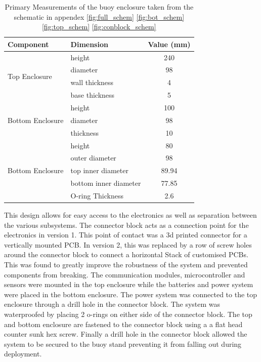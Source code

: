 \begin{table}[H]
    \centering
    \caption{Primary Measurements of the buoy enclosure taken from the schematic in appendex \ref{fig:full_schem} \ref{fig:bot_schem} \ref{fig:top_schem} \ref{fig:conblock_schem}}
    \begin{tabular}{||l  l c||}
    \hline
         \textbf{Component} &   \textbf{Dimension} &   \textbf{Value (mm)} \\
         \hline
         \hline
         \multirow{4}{*}{Top Enclosure} & height & 240\\
         &  diameter & 98  \\
         &  wall thickness & 4 \\ 
         & base thickness & 5 \\
         \hline
        \multirow{3}{*}{Bottom Enclosure} & height & 100\\
         &  diameter & 98  \\
         & thickness & 10 \\ 
         \hline
        \multirow{5}{*}{Bottom Enclosure} & height & 80\\
         &  outer diameter & 98  \\
         &  top inner diameter & 89.94  \\ 
         &  bottom inner diameter & 77.85\\
         &  O-ring Thickness & 2.6 \\
         \hline
    \end{tabular}

    \label{tab:enc_meas}
\end{table}

This design allows for easy access to the electronics as well as separation between the various subsystems. The connector block acts as a connection point for the electronics in version 1. This point of contact was a 3d printed connector for a vertically mounted PCB. In version 2, this was replaced by a row of screw holes around the connector block to connect a horizontal Stack of customised PCBs. This was found to greatly improve the robustness of the system and prevented components from breaking. The communication modules, microcontroller and sensors were mounted in the top enclosure while the batteries and power system were placed in the bottom enclosure. The power system was connected to the top enclosure through a drill hole in the connector block. The system was waterproofed by placing 2 o-rings on either side of the connector block. The top and bottom enclosure are fastened to the connector block using a a flat head counter sunk hex screw. Finally a drill hole in the connector block allowed the system to be secured to the buoy stand preventing it from falling out during deployment.

